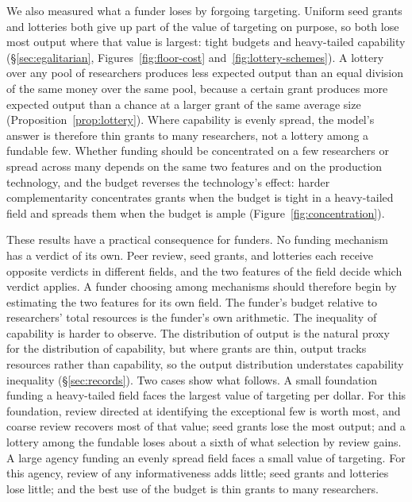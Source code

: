 \documentclass[article, 11pt, reqno]{amsart}
\theoremstyle{named}
\begin{document}
We also measured what a funder loses by forgoing targeting. Uniform seed grants and
lotteries both give up part of the value of targeting on purpose, so both lose most
output where that value is largest: tight budgets and heavy-tailed capability
(\S\ref{sec:egalitarian}, Figures~\ref{fig:floor-cost} and~\ref{fig:lottery-schemes}).
A lottery over any pool of researchers produces less expected output than an equal
division of the same money over the same pool, because a certain grant produces more
expected output than a chance at a larger grant of the same average size
(Proposition~\ref{prop:lottery}). Where capability is evenly spread, the model's
answer is therefore thin grants to many researchers, not a lottery among a fundable
few. Whether funding should be concentrated on a few researchers or spread across
many depends on the same two features and on the production technology, and the
budget reverses the technology's effect: harder complementarity concentrates grants
when the budget is tight in a heavy-tailed field and spreads them when the budget is
ample (Figure~\ref{fig:concentration}).

These results have a practical consequence for funders. No funding mechanism has a
verdict of its own. Peer review, seed grants, and lotteries each receive opposite
verdicts in different fields, and the two features of the field decide which verdict
applies. A funder choosing among mechanisms should therefore begin by estimating the
two features for its own field. The funder's budget relative to researchers' total
resources is the funder's own arithmetic. The inequality of capability is harder to
observe. The distribution of output is the natural proxy for the distribution of
capability, but where grants are thin, output tracks resources rather than
capability, so the output distribution understates capability inequality
(\S\ref{sec:records}). Two cases show what follows. A small foundation funding a
heavy-tailed field faces the largest value of targeting per dollar. For this
foundation, review directed at identifying the exceptional few is worth most, and
coarse review recovers most of that value; seed grants lose the most output; and a
lottery among the fundable loses about a sixth of what selection by review gains. A
large agency funding an evenly spread field faces a small value of targeting. For
this agency, review of any informativeness adds little; seed grants and lotteries
lose little; and the best use of the budget is thin grants to many researchers.
\end{document}
